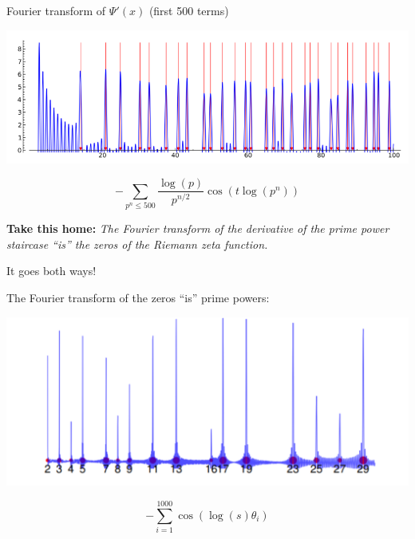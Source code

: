 \documentclass{beamer}
\begin{document}
\begin{frame}{Fourier transform of $\Psi'(x)$ (first 500 terms)}

  \includegraphics[height=.43\textheight]{pics/prime-power-freq-500}
  \vfill

  $$
  -\sum_{p^n\leq 500}{\frac{\log(p)}{p^{n/2}}}\cos(t\log(p^n))
  $$

  {\bf Take this home:}
  {\em The Fourier transform of the derivative of the prime power staircase ``is'' the
  zeros of the Riemann zeta function.}

\end{frame}


\begin{frame}{It goes both ways!}

  The Fourier transform of the zeros ``is'' prime powers:

  \begin{center}
    \includegraphics[height=.55\textheight]{pics/zeros-series-1000}
  \end{center}

  $$-\sum_{i=1}^{1000}
  \cos(\log(s)\theta_i)$$


\end{frame}
\end{document}
